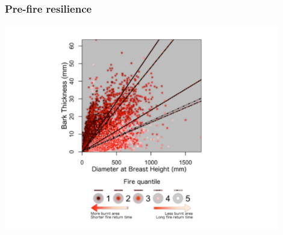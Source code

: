 \begin{frame}
	\frametitle{Pre-fire resilience}
	\includegraphics[width=12cm]{images/BTvsDBH}%
\end{frame}
